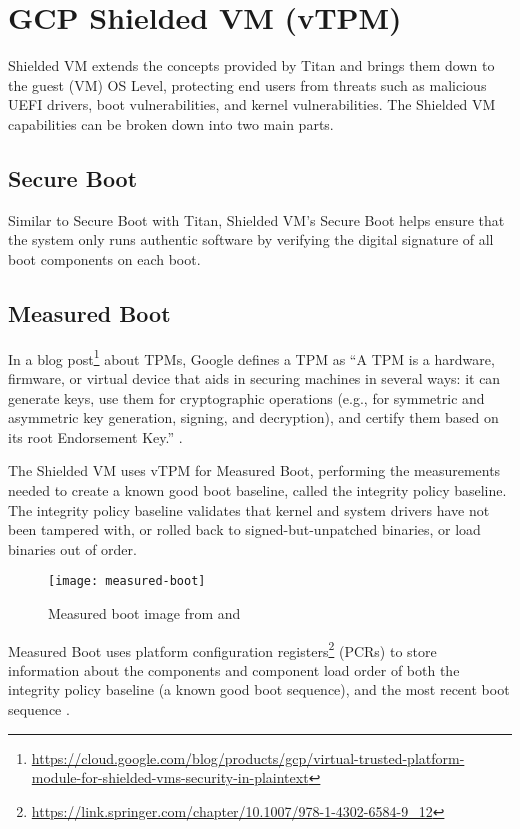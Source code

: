 
\section{GCP Shielded VM (vTPM)}


Shielded VM extends the concepts provided by Titan 
and brings them down to the guest (VM) OS Level, 
protecting end users from threats such as malicious UEFI drivers, 
boot vulnerabilities, and kernel vulnerabilities. 
The Shielded VM capabilities can be broken down into two main parts.

\subsection{Secure Boot}
Similar to Secure Boot with Titan, 
Shielded VM’s Secure Boot helps ensure that the system only runs authentic software 
by verifying the digital signature of all boot components on each boot.

\subsection{Measured Boot}
In a blog post\footnote{\url{https://cloud.google.com/blog/products/gcp/virtual-trusted-platform-module-for-shielded-vms-security-in-plaintext}} 
about TPMs, Google defines a TPM as 
“A TPM is a hardware, firmware, or virtual device that aids in securing machines 
in several ways: it can generate keys, use them for cryptographic operations 
(e.g., for symmetric and asymmetric key generation, signing, and decryption), 
and certify them based on its root Endorsement Key.” 
\citep{zimmerman_virtual_2018}.

The Shielded VM uses vTPM for Measured Boot, 
performing the measurements needed to create a known good boot baseline, 
called the integrity policy baseline. 
The integrity policy baseline validates that kernel and system drivers 
have not been tampered with, or rolled back to signed-but-unpatched binaries,
or load binaries out of order.

\begin{figure}[!ht]
    \centering
    \texttt{[image: measured-boot]}
    \caption{Measured boot image from \cite{leibl_gcp_2022} and \cite{google_what_2022}}
    \label{fig:measured-boot}
\end{figure}


Measured Boot uses 
platform configuration registers\footnote{\url{https://link.springer.com/chapter/10.1007/978-1-4302-6584-9_12}} 
(PCRs) 
to store information about the components and component load order 
of both the integrity policy baseline 
(a known good boot sequence), 
and the most recent boot sequence 
\citep{arthur_platform_2015}.

